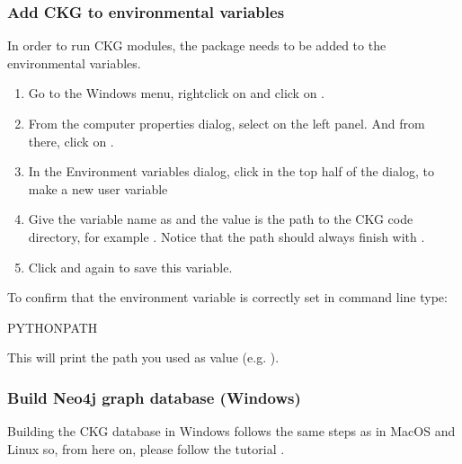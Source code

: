 \documentclass[letterpaper,10pt,english]{sphinxmanual}
\begin{document}
\subsubsection{Add CKG to environmental variables}
\label{\detokenize{intro/getting-started-with-windows:add-ckg-to-environmental-variables}}
In order to run CKG modules, the package needs to be added to the environmental variables.
\begin{enumerate}
%
\item {} 
Go to the Windows menu, right\sphinxhyphen{}click on  and click on .

\item {} 
From the computer properties dialog, select  on the left panel. And from there, click on .

\item {} 
In the Environment variables dialog, click  in the top half of the dialog, to make a new user variable

\item {} 
Give the variable name as  and the value is the path to the CKG code directory, for example . Notice that the path should always finish with .

\item {} 
Click  and  again to save this variable.

\end{enumerate}

To confirm that the environment variable is correctly set in command line type:

\begin{sphinxVerbatim}[commandchars=\\\{\}]
\PYGZgt{}  \PYGZpc{}PYTHONPATH\PYGZpc{}
\end{sphinxVerbatim}

This will print the path you used as value (e.g. ).


\subsubsection{Build Neo4j graph database (Windows)}
\label{\detokenize{intro/getting-started-with-windows:build-neo4j-graph-database-windows}}
Building the CKG database in Windows follows the same steps as in MacOS and Linux so, from here on, please follow the tutorial {\hyperref[\detokenize{intro/getting-started-with-build:build-neo4j-graph-database}]{}}.
\end{document}
